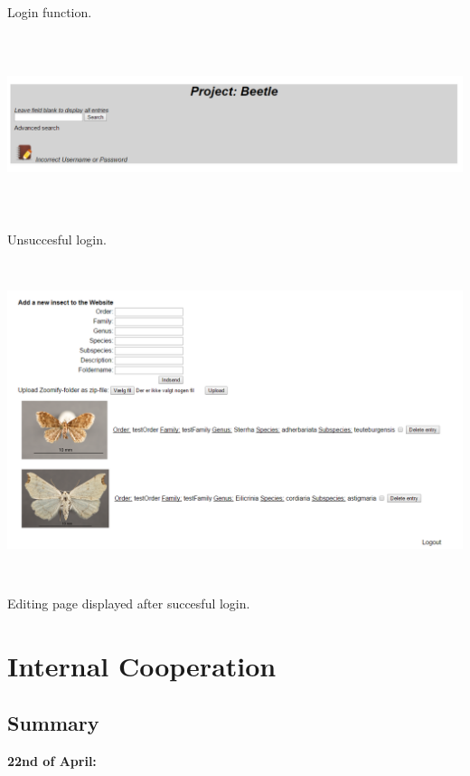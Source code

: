 \documentclass[12pt,a4paper]{article}
\begin{document}
Login function.\\
\includegraphics[height=60mm]{Beetle9.png}\\
Unsuccesful login.\\
\includegraphics[height=100mm]{Beetle10.png}\\
Editing page displayed after succesful login.\\
\newpage

\section{Internal Cooperation}
\subsection{Summary}

{\bf 22nd of April:}
\end{document}
